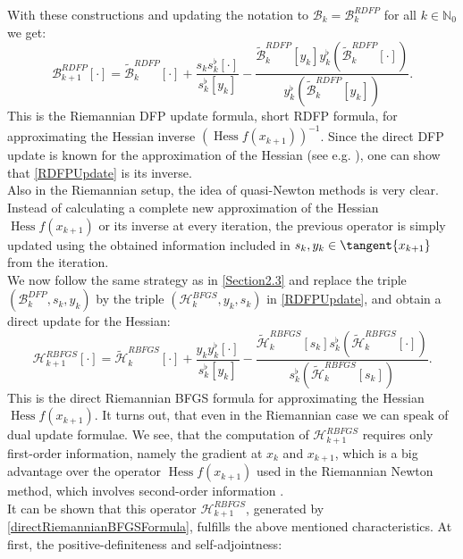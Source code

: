 With these constructions and updating the notation to $\mathcal{B}_k = \mathcal{B}^{RDFP}_k$ for all $k \in \mathbb{N}_0$ we get:
\begin{equation}\label{RDFPUpdate}
    \mathcal{B}^{RDFP}_{k+1} [\cdot] = \widetilde{\mathcal{B}}^{RDFP}_k [\cdot] + \frac{s_k s^{\flat}_k[\cdot]}{s^{\flat}_k [y_k]} - \frac{\widetilde{\mathcal{B}}^{RDFP}_k [y_k]  y^{\flat}_k (\widetilde{\mathcal{B}}^{RDFP}_k [\cdot])}{y^{\flat}_k (\widetilde{\mathcal{B}}^{RDFP}_k [y_k])}.
\end{equation}
This is the Riemannian DFP update formula, short RDFP formula, for approximating the Hessian inverse $(\operatorname{Hess} f(x_{k+1}))^{-1}$. Since the direct DFP update is known for the approximation of the Hessian (see e.g. \cite[p.~19]{Huang:2013}), one can show that \cref{RDFPUpdate} is its inverse. \\
Also in the Riemannian setup, the idea of quasi-Newton methods is very clear. Instead of calculating a complete new approximation of the Hessian $\operatorname{Hess} f(x_{k+1})$ or its inverse at every iteration, the previous operator is simply updated using the obtained information included in $s_k, y_k \in \tangent{x_{k+1}}$ from the iteration. \\
We now follow the same strategy as in \cref{Section2.3} and replace the triple $(\mathcal{B}^{DFP}_k,s_k,y_k)$ by the triple $(\mathcal{H}^{BFGS}_k,y_k,s_k)$ in \cref{RDFPUpdate}, and obtain a direct update for the Hessian:
\begin{equation}\label{directRiemannianBFGSFormula}
    \mathcal{H}^{RBFGS}_{k+1} [\cdot] = \widetilde{\mathcal{H}}^{RBFGS}_k [\cdot] + \frac{y_k y^{\flat}_k[\cdot]}{s^{\flat}_k [y_k]} - \frac{\widetilde{\mathcal{H}}^{RBFGS}_k [s_k] s^{\flat}_k (\widetilde{\mathcal{H}}^{RBFGS}_k [\cdot])}{s^{\flat}_k (\widetilde{\mathcal{H}}^{RBFGS}_k [s_k])}.
\end{equation}
This is the direct Riemannian BFGS formula for approximating the Hessian $\operatorname{Hess} f(x_{k+1})$. It turns out, that even in the Riemannian case we can speak of dual update formulae. We see, that the computation of $\mathcal{H}^{RBFGS}_{k+1}$ requires only first-order information, namely the gradient at $x_k$ and $x_{k+1}$, which is a big advantage over the operator $\operatorname{Hess} f(x_{k+1})$ used in the Riemannian Newton method, which involves second-order information \cite[p.~206]{Gabay:1982}. \\
It can be shown that this operator $\mathcal{H}^{RBFGS}_{k+1}$, generated by \cref{directRiemannianBFGSFormula}, fulfills the above mentioned characteristics. At first, the positive-definiteness and self-adjointness:

